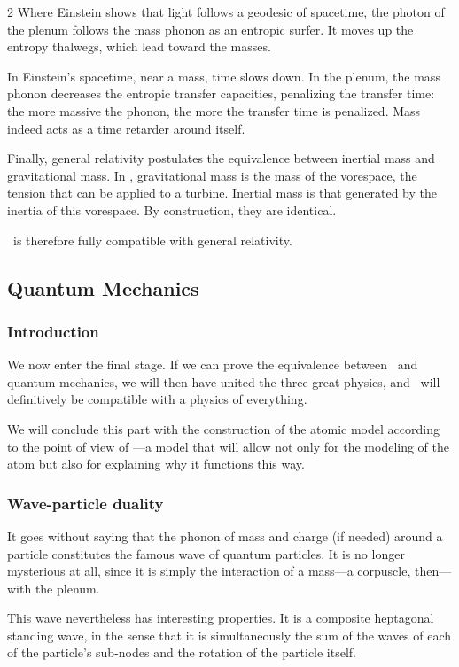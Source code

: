 \begin{multicols}{2}
	Where Einstein shows that light follows a geodesic of spacetime, the photon of the plenum follows the mass phonon as an entropic surfer. It moves up the entropy thalwegs, which lead toward the masses.
	
	In Einstein's spacetime, near a mass, time slows down. In the plenum, the mass phonon decreases the entropic transfer capacities, penalizing the transfer time: the more massive the phonon, the more the transfer time is penalized. Mass indeed acts as a time retarder around itself.
	
	Finally, general relativity postulates the equivalence between inertial mass and gravitational mass. In \PQ, gravitational mass is the mass of the vorespace, the tension that can be applied to a turbine. Inertial mass is that generated by the inertia of this vorespace. By construction, they are identical.
	
	\PQ\ is therefore fully compatible with general relativity.
	
	\subsection{Quantum Mechanics}
	
	\subsubsection{Introduction}
	
	We now enter the final stage. If we can prove the equivalence between \PQ\ and quantum mechanics, we will then have united the three great physics, and \PQ\ will definitively be compatible with a physics of everything.
	
	We will conclude this part with the construction of the atomic model according to the point of view of \PQ—a model that will allow not only for the modeling of the atom but also for explaining why it functions this way.
	
	\subsubsection{Wave-particle duality}
	
	It goes without saying that the phonon of mass and charge (if needed) around a particle constitutes the famous wave of quantum particles. It is no longer mysterious at all, since it is simply the interaction of a mass—a corpuscle, then—with the plenum.
	
	
	
	This wave nevertheless has interesting properties. It is a composite heptagonal standing wave, in the sense that it is simultaneously the sum of the waves of each of the particle's sub-nodes and the rotation of the particle itself.
	

\end{multicols}
